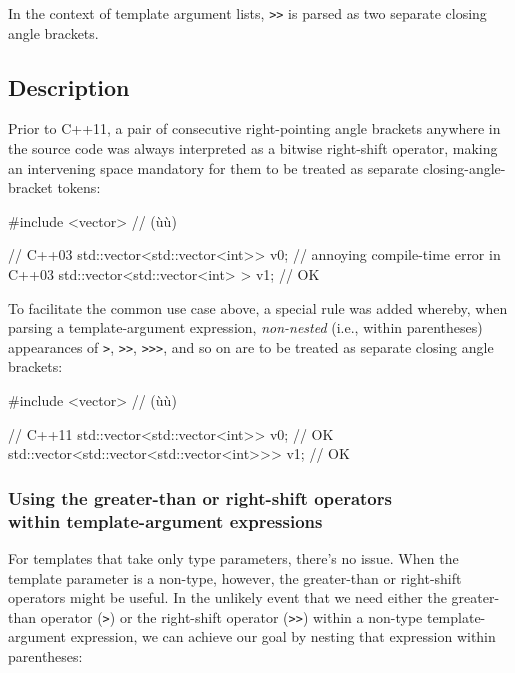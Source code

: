 In the context of template argument lists, \lstinline!>>! is parsed as two
separate closing angle brackets.

\subsection[Description]{Description}\label{description}

Prior to C++11, a pair of consecutive right-pointing angle brackets anywhere in
the source code was always interpreted as a bitwise right-shift
operator, making an intervening space mandatory for them to be treated
as separate closing-angle-bracket tokens:

\begin{emcppshiddenlisting}[emcppsbatch=e1]
#include <vector>  // (ù{}ù)
\end{emcppshiddenlisting}
\begin{emcppslisting}[emcppsbatch=e1]
// C++03
std::vector<std::vector<int>> v0;   // annoying compile-time error in C++03
std::vector<std::vector<int> > v1;  // OK
\end{emcppslisting}

\noindent To facilitate the common use case above, a special rule was added
whereby, when parsing a template-argument expression, \emph{non-nested}
(i.e., within parentheses) appearances of \lstinline!>!, \lstinline!>>!,
\lstinline!>>>!, and so on are to be treated as separate closing angle brackets:

\begin{emcppshiddenlisting}[emcppsbatch=e2]
#include <vector>  // (ù{}ù)
\end{emcppshiddenlisting}
\begin{emcppslisting}[emcppsbatch=e2]
// C++11
std::vector<std::vector<int>> v0;               // OK
std::vector<std::vector<std::vector<int>>> v1;  // OK
\end{emcppslisting}

\subsubsection[Using the greater-than or right-shift operators within template-argument expressions]{Using the greater-than or right-shift operators\\[0.5ex] within template-argument expressions}\label{using-the-greater-than-or-right-shift-operators-within-template-argument-expressions}

For templates that take only type parameters, there's no issue. When the
template parameter is a non-type, however, the greater-than or right-shift operators might be
useful. In the unlikely event that we need either the greater-than
operator (\lstinline!>!) or the right-shift operator (\lstinline!>>!) within a
non-type template-argument expression, we can achieve our goal by
nesting that expression within parentheses:

